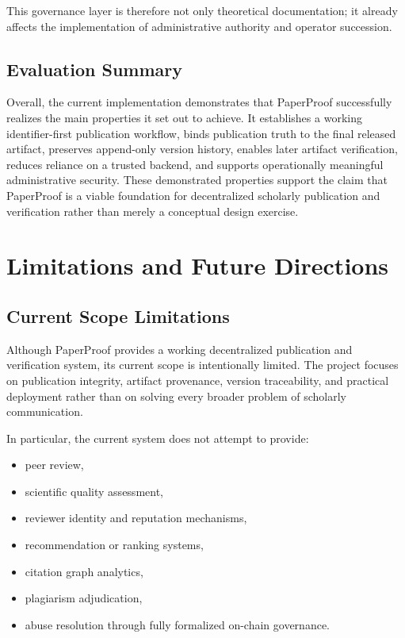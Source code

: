 \documentclass[journal]{IEEEtran}
\begin{document}
This governance layer is therefore not only theoretical documentation; it already affects the implementation of administrative authority and operator succession.

\subsection{Evaluation Summary}

Overall, the current implementation demonstrates that PaperProof successfully realizes the main properties it set out to achieve. It establishes a working identifier-first publication workflow, binds publication truth to the final released artifact, preserves append-only version history, enables later artifact verification, reduces reliance on a trusted backend, and supports operationally meaningful administrative security. These demonstrated properties support the claim that PaperProof is a viable foundation for decentralized scholarly publication and verification rather than merely a conceptual design exercise.


\section{Limitations and Future Directions}

\subsection{Current Scope Limitations}

Although PaperProof provides a working decentralized publication and verification system, its current scope is intentionally limited. The project focuses on publication integrity, artifact provenance, version traceability, and practical deployment rather than on solving every broader problem of scholarly communication.

In particular, the current system does not attempt to provide:
\begin{itemize}
    \item peer review,
    \item scientific quality assessment,
    \item reviewer identity and reputation mechanisms,
    \item recommendation or ranking systems,
    \item citation graph analytics,
    \item plagiarism adjudication,
    \item abuse resolution through fully formalized on-chain governance.
\end{itemize}
\end{document}
